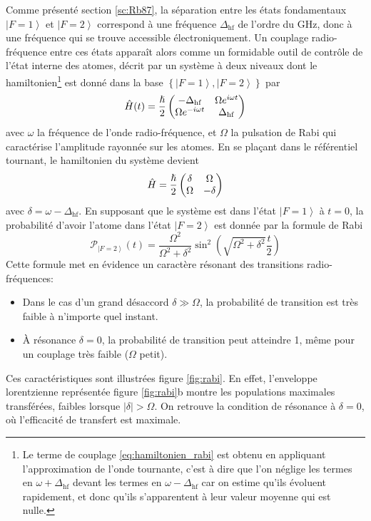 Comme présenté section \ref{sc:Rb87}, la séparation entre les états fondamentaux $\left| F=1 \right\rangle$ et $\left| F=2 \right\rangle$ correspond à une fréquence $\Delta_{\mathrm{hf}}$ de l'ordre du GHz, donc à une fréquence qui se trouve accessible électroniquement. Un couplage radio-fréquence entre ces états apparaît alors comme un formidable outil de contrôle de l'état interne des atomes, décrit par un système à deux niveaux dont le hamiltonien\footnote{Le terme de couplage \ref{eq:hamiltonien_rabi} est obtenu en appliquant l'approximation de l'onde tournante, c'est à dire que l'on néglige les termes en $\omega +\Delta_{\mathrm{hf}}$ devant les termes en $\omega - \Delta_{\mathrm{hf}}$ car on estime qu'ils évoluent rapidement, et donc qu'ils s'apparentent à leur valeur moyenne qui est nulle.} est donné dans la base $\left\lbrace \left|F=1\right\rangle, \left|F=2\right\rangle \right\rbrace$ par 
\begin{equation}
\hat{H}(t)=\frac{\hslash}{2} \begin{pmatrix}
-\Delta_{\mathrm{hf}} & \Omega e^{i \omega t} \\
\Omega e^{-i\omega t} & \Delta_{\mathrm{hf}}
\end{pmatrix}
\label{eq:hamiltonien_rabi}
\end{equation}
avec $\omega$ la fréquence de l'onde radio-fréquence, et $\Omega$ la pulsation de Rabi qui caractérise l'amplitude rayonnée sur les atomes.  En se plaçant dans le référentiel tournant, le hamiltonien du système devient
\begin{equation}
\hat{H}=\frac{\hslash}{2} \begin{pmatrix}
\delta & \Omega \\
\Omega & -\delta
\end{pmatrix}
\end{equation}
avec $\delta=\omega- \Delta_{\mathrm{hf}}$. En supposant que le système est dans l'état $\left| F=1 \right\rangle$ à $t=0$, la probabilité d'avoir l'atome dans l'état $\left| F=2 \right\rangle$ est donnée par la formule de Rabi \citep{basdevant2002mecanique}
\begin{equation}
\mathcal{P}_{\left| F=2 \right\rangle}(t)= \frac{\Omega^2}{\Omega^2+\delta^2} \sin^2{\left(\sqrt{\Omega^2+\delta^2} \frac{t}{2} \right) }
\label{eq:rabi_formule}
\end{equation}
Cette formule met en évidence un caractère résonant des transitions radio-fréquences:
\begin{itemize}
\item[\textendash] Dans le cas d'un grand désaccord $\delta \gg \Omega$, la probabilité de transition est très faible à n'importe quel instant.
\item[\textendash] À résonance $\delta=0$, la probabilité de transition peut atteindre 1, même pour un couplage très faible ($\Omega$ petit).
\end{itemize}
Ces caractéristiques sont illustrées figure \ref{fig:rabi}. En effet, l'enveloppe lorentzienne représentée figure \ref{fig:rabi}b montre les populations maximales transférées, faibles lorsque $\left| \delta \right| > \Omega$. On retrouve la condition de résonance à $\delta=0$, où l'efficacité de transfert est maximale.

